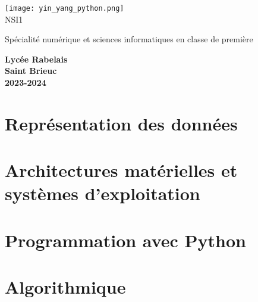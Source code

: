 \documentclass[10pt,a4paper]{nsibook}
\begin{document}
\begin{titlepage}
    \begin{center}
        \texttt{[image: yin\_yang\_python.png]}\\[2em]

        {\bigtitlefont \LARGE\color{gray} NSI1\\}

        {\titlefont\Large\color{gray} Spécialité numérique et sciences informatiques en classe de première\\[2em]}

        {\color{gray}\textbf{Lycée Rabelais\\ Saint Brieuc\\ 2023-2024}}
    \end{center}
\end{titlepage}
\part{Représentation des données}





\part{Architectures matérielles et \\systèmes d'exploitation}



\part{Programmation avec Python}




\part{Algorithmique}



\tableofcontents
\end{document}
